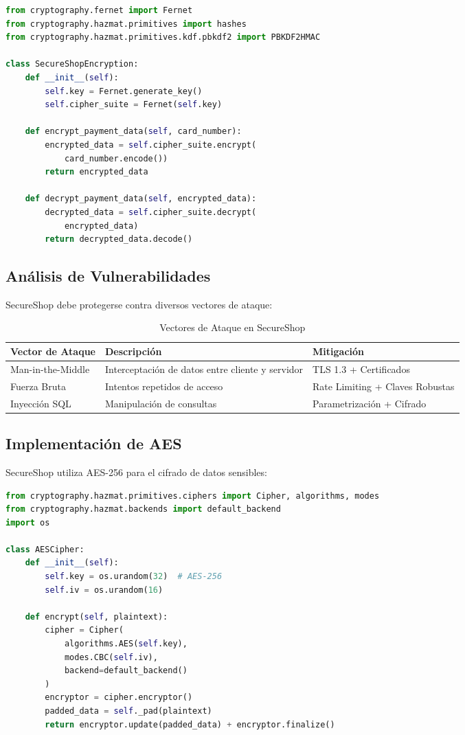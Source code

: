 \begin{lstlisting}[language=Python, caption=Ejemplo de implementación AES en SecureShop]
from cryptography.fernet import Fernet
from cryptography.hazmat.primitives import hashes
from cryptography.hazmat.primitives.kdf.pbkdf2 import PBKDF2HMAC

class SecureShopEncryption:
    def __init__(self):
        self.key = Fernet.generate_key()
        self.cipher_suite = Fernet(self.key)
    
    def encrypt_payment_data(self, card_number):
        encrypted_data = self.cipher_suite.encrypt(
            card_number.encode())
        return encrypted_data
    
    def decrypt_payment_data(self, encrypted_data):
        decrypted_data = self.cipher_suite.decrypt(
            encrypted_data)
        return decrypted_data.decode()
\end{lstlisting}

\subsection{Análisis de Vulnerabilidades}
SecureShop debe protegerse contra diversos vectores de ataque:

\begin{table}[h]
\centering
\begin{tabular}{|p{3cm}|p{6cm}|p{4cm}|}
\hline
\textbf{Vector de Ataque} & \textbf{Descripción} & \textbf{Mitigación} \\
\hline
Man-in-the-Middle & Interceptación de datos entre cliente y servidor & TLS 1.3 + Certificados \\
\hline
Fuerza Bruta & Intentos repetidos de acceso & Rate Limiting + Claves Robustas \\
\hline
Inyección SQL & Manipulación de consultas & Parametrización + Cifrado \\
\hline
\end{tabular}
\caption{Vectores de Ataque en SecureShop}
\end{table}

\subsection{Implementación de AES}
SecureShop utiliza AES-256 para el cifrado de datos sensibles:

\begin{lstlisting}[language=Python, caption=Implementación AES-256 en SecureShop]
from cryptography.hazmat.primitives.ciphers import Cipher, algorithms, modes
from cryptography.hazmat.backends import default_backend
import os

class AESCipher:
    def __init__(self):
        self.key = os.urandom(32)  # AES-256
        self.iv = os.urandom(16)
    
    def encrypt(self, plaintext):
        cipher = Cipher(
            algorithms.AES(self.key),
            modes.CBC(self.iv),
            backend=default_backend()
        )
        encryptor = cipher.encryptor()
        padded_data = self._pad(plaintext)
        return encryptor.update(padded_data) + encryptor.finalize()
\end{lstlisting}

